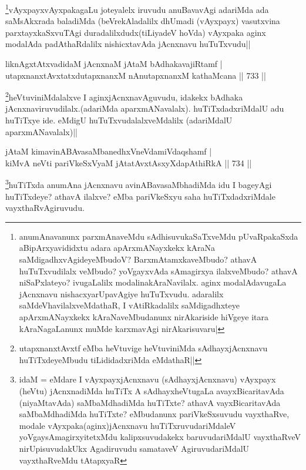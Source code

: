 \begin{artha}
\footnote{anumAnavanunx parxmAnaveMdu sAdhisuvukaSaTxveMdu pUvaRpakaSxda aBipArxyavididxtu adara apArxmANayxkekx kAraNa saMdigadhxvAgideyeMbudoV? BarxmAtamxkaveMbudo? athavA huTuTxvudilalx veMbudo? yoVgayxvAda sAmagirxya ilalxveMbudo? athavA niSaPxlateyo? ivugaLalilx modalinakAraNavilalx. aginx modalAdavugaLa jAcnxnavu nishacxyarUpavAgiye huTuTxvudu. adaralilx saMdeVhavilalxveMdathaR, I vAtiRkadalilx saMdigadhxteye apArxmANayxkekx kAraNaveMbudanunx nirAkariside hiVgeye itara kAraNagaLanunx muMde karxmavAgi nirAkarisuvaru|}vAyxpayxvAyxpakagaLu joteyalelx iruvudu anuBavavAgi adariMda ada saMsAkxrada baladiMda (beVrekAladalilx dhUmadi (vAyxpayx) vasutxvina parxtayxkaSxvuTAgi duradalilxdudx(tiLiyadeV hoVda) vAyxpaka aginx modalAda padAthaRdalilx nishicxtavAda jAcnxnavu huTuTxvudu||
\end{artha}

\begin{shl}
liknAgxtAtxvadidaM jAcnxnaM jAtaM bAdhakavajiRtamf | \\
utapxnanxtAvxtatxdutapxnanxM nAnutapxnanxM kathaMcana \hfill||  733 ||  
\end{shl}

\begin{artha}
\footnote{utapxnanxtAvxtf eMba heVtuvige heVtuviniMda sAdhayxjAcnxnavu huTiTxdeyeMbudu tiLididadxriMda eMdathaR||}heVtuviniMdalalxve  I aginxjAcnxnavAguvudu, idakekx bAdhaka jAcnxnaviruvudilalx.(adariMda aparxmANavalalx). huTiTxdadxriMdalU adu huTiTxye ide. eMdigU huTuTxvudalalxveMdalilx (adariMdalU aparxmANavalalx)||
\end{artha}


\begin{shl}
jAtaM kimavinABAvasaMbanedhxVneVdamiVdaqshamf | \\
kiMvA neVti pariVkeSxVyaM jAtatAvxtAsxyXdapAthiRkA \hfill||  734 ||  
\end{shl}

\begin{artha}
\footnote{idaM = eMdare I vAyxpayxjAcnxnavu (sAdhayxjAcnxnavu) vAyxpayx (heVtu) jAcnxnadiMda huTiTx A sAdhayxheVtugaLa avayxBicaritavAda (niyaMtavAda) saMbaMdhadiMda huTiTxte? athavA vayxBicaritavAda saMbaMdhadiMda huTiTxte? eMbudanunx pariVkeSxsuvudu vayxthaRve, modale vAyxpaka(aginx)jAcnxnavu huTiTxruvudariMdaleV yoVgaysAmagirxyitetxMdu kalipxsuvudakekx baruvudariMdalU vayxthaRveV nirUpisuvudakUkx Agadiruvudu samataveV AgiruvudariMdalU vayxthaRveMdu tAtapxyaR}huTiTxda anumAna jAcnxnavu avinABavasaMbhadiMda idu I bageyAgi huTiTxdeye? athavA ilalxve? eMba pariVkeSxyu saha huTiTxdadxriMdale vayxthaRvAgiruvudu.
\end{artha}

